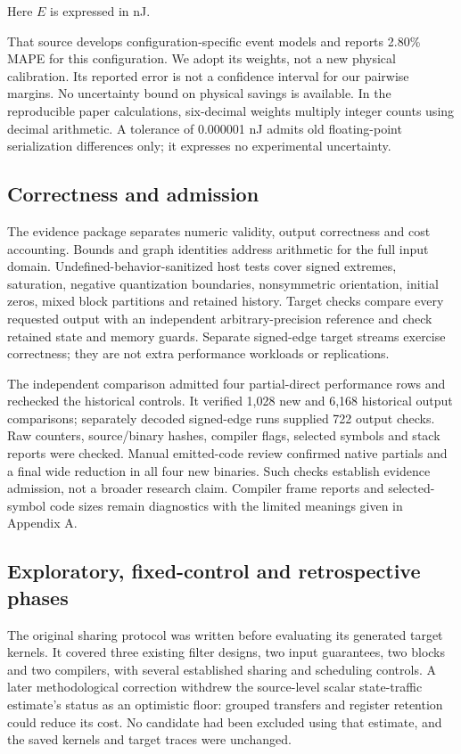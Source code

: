 \documentclass[conference]{IEEEtran}
\begin{document}
Here \(E\) is expressed in nJ.

That source develops configuration-specific event models and reports
2.80\% MAPE for this configuration. We adopt its weights, not a new
physical calibration. Its reported error is not a confidence interval
for our pairwise margins. No uncertainty bound on physical savings is
available. In the reproducible paper calculations, six-decimal weights
multiply integer counts using decimal arithmetic. A tolerance of
0.000001 nJ admits old floating-point serialization differences only; it
expresses no experimental uncertainty.

\subsection{Correctness and admission}\label{correctness-and-admission}

The evidence package separates numeric validity, output correctness and
cost accounting. Bounds and graph identities address arithmetic for the
full input domain. Undefined-behavior-sanitized host tests cover signed
extremes, saturation, negative quantization boundaries, nonsymmetric
orientation, initial zeros, mixed block partitions and retained history.
Target checks compare every requested output with an independent
arbitrary-precision reference and check retained state and memory
guards. Separate signed-edge target streams exercise correctness; they
are not extra performance workloads or replications.

The independent comparison admitted four partial-direct performance rows
and rechecked the historical controls. It verified 1,028 new and 6,168
historical output comparisons; separately decoded signed-edge runs
supplied 722 output checks. Raw counters, source/binary hashes, compiler
flags, selected symbols and stack reports were checked. Manual
emitted-code review confirmed native partials and a final wide reduction
in all four new binaries. Such checks establish evidence admission, not
a broader research claim. Compiler frame reports and selected-symbol
code sizes remain diagnostics with the limited meanings given in
Appendix A.

\subsection{Exploratory, fixed-control and retrospective phases}\label{exploratory-fixed-control-and-retrospective-phases}

The original sharing protocol was written before evaluating its
generated target kernels. It covered three existing filter designs, two
input guarantees, two blocks and two compilers, with several established
sharing and scheduling controls. A later methodological correction
withdrew the source-level scalar state-traffic estimate's status as an
optimistic floor: grouped transfers and register retention could reduce
its cost. No candidate had been excluded using that estimate, and the
saved kernels and target traces were unchanged.
\end{document}
